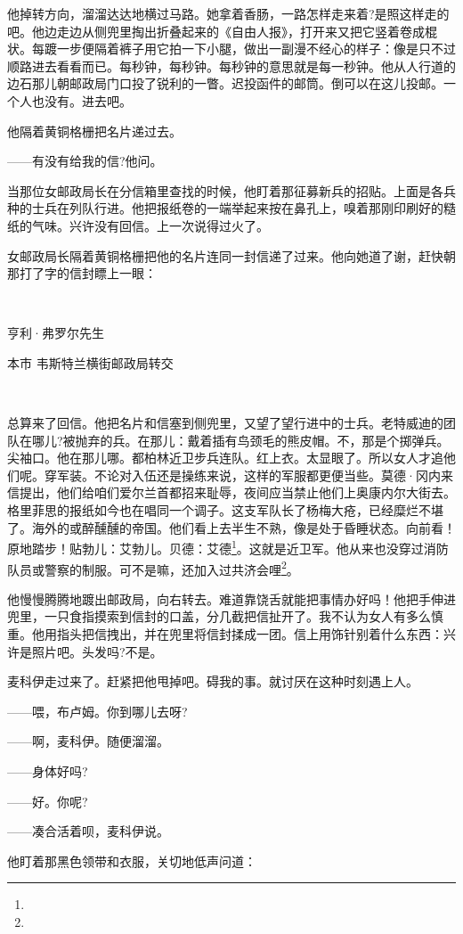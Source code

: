 \par 他掉转方向，溜溜达达地横过马路。她拿着香肠，一路怎样走来着?是照这样走的吧。他边走边从侧兜里掏出折叠起来的《自由人报》，打开来又把它竖着卷成棍状。每踱一步便隔着裤子用它拍一下小腿，做出一副漫不经心的样子：像是只不过顺路进去看看而已。每秒钟，每秒钟。每秒钟的意思就是每一秒钟。他从人行道的边石那儿朝邮政局门口投了锐利的一瞥。迟投函件的邮筒。倒可以在这儿投邮。一个人也没有。进去吧。
\par 他隔着黄铜格栅把名片递过去。
\par ——有没有给我的信?他问。
\par 当那位女邮政局长在分信箱里查找的时候，他盯着那征募新兵的招贴。上面是各兵种的士兵在列队行进。他把报纸卷的一端举起来按在鼻孔上，嗅着那刚印刷好的糙纸的气味。兴许没有回信。上一次说得过火了。
\par 女邮政局长隔着黄铜格栅把他的名片连同一封信递了过来。他向她道了谢，赶快朝那打了字的信封瞟上一眼：
\par  
\par 亨利·弗罗尔先生
\par 本市 韦斯特兰横街邮政局转交
\par  
\par 总算来了回信。他把名片和信塞到侧兜里，又望了望行进中的士兵。老特威迪的团队在哪儿?被抛弃的兵。在那儿：戴着插有鸟颈毛的熊皮帽。不，那是个掷弹兵。尖袖口。他在那儿哪。都柏林近卫步兵连队。红上衣。太显眼了。所以女人才追他们呢。穿军装。不论对入伍还是操练来说，这样的军服都更便当些。莫德·冈内来信提出，他们给咱们爱尔兰首都招来耻辱，夜间应当禁止他们上奥康内尔大街去。格里菲思的报纸如今也在唱同一个调子。这支军队长了杨梅大疮，已经糜烂不堪了。海外的或醉醺醺的帝国。他们看上去半生不熟，像是处于昏睡状态。向前看！原地踏步！贴勃儿：艾勃儿。贝德：艾德\footnote{}。这就是近卫军。他从来也没穿过消防队员或警察的制服。可不是嘛，还加入过共济会哩\footnote{}。
\par 他慢慢腾腾地踱出邮政局，向右转去。难道靠饶舌就能把事情办好吗！他把手伸进兜里，一只食指摸索到信封的口盖，分几截把信扯开了。我不认为女人有多么慎重。他用指头把信拽出，并在兜里将信封揉成一团。信上用饰针别着什么东西：兴许是照片吧。头发吗?不是。
\par 麦科伊走过来了。赶紧把他甩掉吧。碍我的事。就讨厌在这种时刻遇上人。
\par ——喂，布卢姆。你到哪儿去呀?
\par ——啊，麦科伊。随便溜溜。
\par ——身体好吗?
\par ——好。你呢?
\par ——凑合活着呗，麦科伊说。
\par 他盯着那黑色领带和衣服，关切地低声问道：
